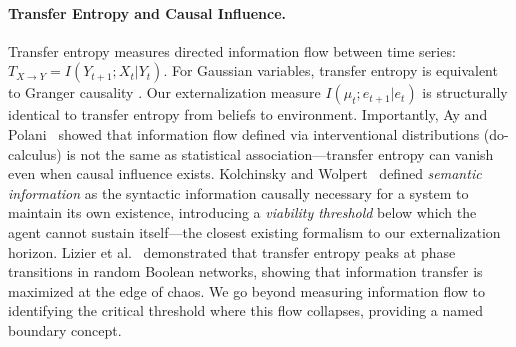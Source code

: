 \documentclass[runningheads]{llncs}
\begin{document}
\paragraph{Transfer Entropy and Causal Influence.}
Transfer entropy \cite{schreiber2000measuring} measures directed information flow between time series: $T_{X \to Y} = I(Y_{t+1}; X_t | Y_t)$. For Gaussian variables, transfer entropy is equivalent to Granger causality \cite{barnett2009granger}. Our externalization measure $I(\mu_t; e_{t+1} | e_t)$ is structurally identical to transfer entropy from beliefs to environment. Importantly, Ay and Polani~\cite{ay2008information} showed that information flow defined via interventional distributions (do-calculus) is not the same as statistical association---transfer entropy can vanish even when causal influence exists. Kolchinsky and Wolpert~\cite{kolchinsky2018semantic} defined \emph{semantic information} as the syntactic information causally necessary for a system to maintain its own existence, introducing a \emph{viability threshold} below which the agent cannot sustain itself---the closest existing formalism to our externalization horizon. Lizier et al.~\cite{lizier2008phase} demonstrated that transfer entropy peaks at phase transitions in random Boolean networks, showing that information transfer is maximized at the edge of chaos. We go beyond measuring information flow to identifying the critical threshold where this flow collapses, providing a named boundary concept.
\end{document}
